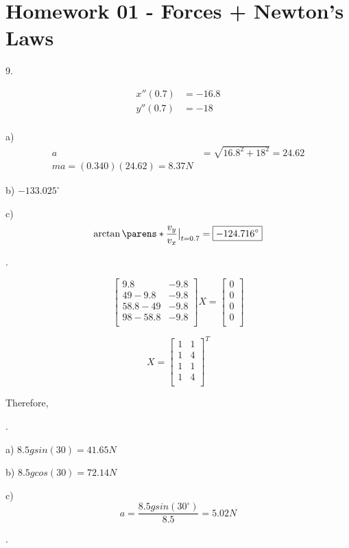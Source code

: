 \documentclass{scrreprt} %
\begin{document}
\section{Homework 01 - Forces + Newton's Laws}

9.

\begin{align*}
	x''(0.7) &= -16.8 \\
	y''(0.7) &= -18 \\
\end{align*}

a) \begin{align*}
a &= \sqrt{16.8^2 + 18^2} = 24.62 \\
ma = (0.340)(24.62) = \boxed{8.37 N}
\end{align*}

b) $-133.025^\circ$

c) $$\evalat{\arctan \parens*{\frac{v_y}{v_x}}}{t = 0.7} = \boxed{-124.716^\circ}$$

.

$$
\begin{bmatrix}
	9.8 & - 9.8 \\
	49 - 9.8 & -9.8 \\
	58.8 - 49 & -9.8 \\
	98 - 58.8 & -9.8 \\
\end{bmatrix}
X
=
\begin{bmatrix}
	0 \\
	0 \\
	0 \\
	0 \\
\end{bmatrix}
$$

$$
X = \begin{bmatrix}
	1 & 1 \\
	1 & 4 \\
	1 & 1 \\
	1 & 4 \\
\end{bmatrix}^T
$$

Therefore, 

.

a) $8.5gsin(30) = \boxed{41.65 N}$

b) $8.5gcos(30) = \boxed{72.14 N}$

c) $$a = \frac{8.5gsin(30^{\circ})}{8.5} = 5.02 N$$

.
\end{document}
